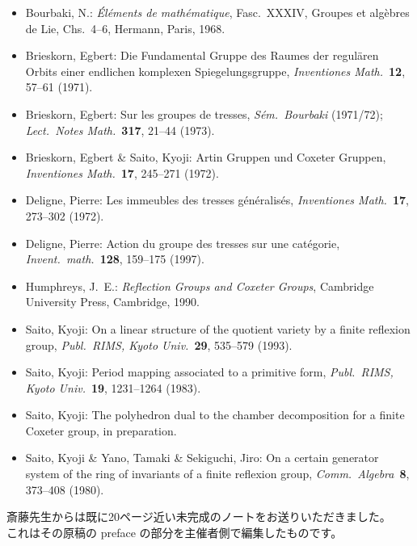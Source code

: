 \documentclass[uplatex,dvipdfmx]{jlreq}
\begin{document}
\begin{itemize}
  \setlength{\itemsep}{3pt}
  \item[{[B]}] Bourbaki, N.:
        \textit{Éléments de mathématique}, Fasc.\ XXXIV,
        Groupes et algèbres de Lie, Chs.\ 4--6,
        Hermann, Paris, 1968.

  \item[{[Br1]}] Brieskorn, Egbert:
        Die Fundamental Gruppe des Raumes der regulären Orbits
        einer endlichen komplexen Spiegelungsgruppe,
        \textit{Inventiones Math.}\ \textbf{12}, 57--61 (1971).

  \item[{[Br2]}] Brieskorn, Egbert:
        Sur les groupes de tresses,
        \textit{Sém.\ Bourbaki} (1971/72);
        \textit{Lect.\ Notes Math.}\ \textbf{317}, 21--44 (1973).

  \item[{[B-S]}] Brieskorn, Egbert \& Saito, Kyoji:
        Artin Gruppen und Coxeter Gruppen,
        \textit{Inventiones Math.}\ \textbf{17}, 245--271 (1972).

  \item[{[D1]}] Deligne, Pierre:
        Les immeubles des tresses généralisés,
        \textit{Inventiones Math.}\ \textbf{17}, 273--302 (1972).

  \item[{[D2]}] Deligne, Pierre:
        Action du groupe des tresses sur une catégorie,
        \textit{Invent.\ math.}\ \textbf{128}, 159--175 (1997).

  \item[{[Hu]}] Humphreys, J.~E.:
        \textit{Reflection Groups and Coxeter Groups},
        Cambridge University Press, Cambridge, 1990.

  \item[{[S1]}] Saito, Kyoji:
        On a linear structure of the quotient variety by a
        finite reflexion group,
        \textit{Publ.\ RIMS, Kyoto Univ.}\ \textbf{29}, 535--579 (1993).

  \item[{[S2]}] Saito, Kyoji:
        Period mapping associated to a primitive form,
        \textit{Publ.\ RIMS, Kyoto Univ.}\ \textbf{19}, 1231--1264 (1983).

  \item[{[S5]}] Saito, Kyoji:
        The polyhedron dual to the chamber decomposition for
        a finite Coxeter group, in preparation.

  \item[{[S-Y-S]}] Saito, Kyoji \& Yano, Tamaki \& Sekiguchi, Jiro:
        On a certain generator system of the ring of invariants
        of a finite reflexion group,
        \textit{Comm.\ Algebra}\ \textbf{8}, 373--408 (1980).
\end{itemize}

\vfill

\begin{footnotesize}
  \noindent
  斎藤先生からは既に20ページ近い未完成のノートをお送りいただきました。\\
  これはその原稿の preface の部分を主催者側で編集したものです。
\end{footnotesize}
\end{document}
